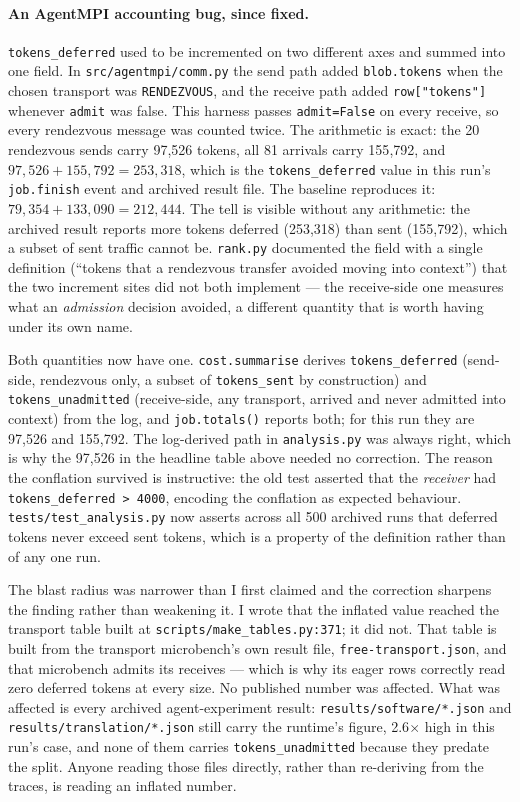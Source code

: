 \documentclass[11pt]{article}
\begin{document}
\paragraph{An AgentMPI accounting bug, since fixed.} \texttt{tokens\_deferred} used to be
incremented on two different axes and summed into one field. In \texttt{src/agentmpi/comm.py} the
send path added \texttt{blob.tokens} when the chosen transport was \texttt{RENDEZVOUS}, and the
receive path added \texttt{row["tokens"]} whenever \texttt{admit} was false. This harness passes
\texttt{admit=False} on every receive, so every rendezvous message was counted twice. The
arithmetic is exact: the 20 rendezvous sends carry 97{,}526 tokens, all 81 arrivals carry
155{,}792, and $97{,}526+155{,}792=253{,}318$, which is the \texttt{tokens\_deferred} value in
this run's \texttt{job.finish} event and archived result file. The baseline reproduces it:
$79{,}354+133{,}090=212{,}444$. The tell is visible without any arithmetic: the archived result
reports more tokens deferred (253{,}318) than sent (155{,}792), which a subset of sent traffic
cannot be. \texttt{rank.py} documented the field with a single definition (``tokens that a
rendezvous transfer avoided moving into context'') that the two increment sites did not both
implement --- the receive-side one measures what an \emph{admission} decision avoided, a different
quantity that is worth having under its own name.

Both quantities now have one. \texttt{cost.summarise} derives \texttt{tokens\_deferred}
(send-side, rendezvous only, a subset of \texttt{tokens\_sent} by construction) and
\texttt{tokens\_unadmitted} (receive-side, any transport, arrived and never admitted into context)
from the log, and \texttt{job.totals()} reports both; for this run they are 97{,}526 and
155{,}792. The log-derived path in \texttt{analysis.py} was always right, which is why the 97{,}526
in the headline table above needed no correction. The reason the conflation survived is instructive:
the old test asserted that the \emph{receiver} had \texttt{tokens\_deferred > 4000}, encoding the
conflation as expected behaviour. \texttt{tests/test\_analysis.py} now asserts across all 500
archived runs that deferred tokens never exceed sent tokens, which is a property of the definition
rather than of any one run.

The blast radius was narrower than I first claimed and the correction sharpens the finding rather
than weakening it. I wrote that the inflated value reached the transport table built at
\texttt{scripts/make\_tables.py:371}; it did not. That table is built from the transport
microbench's own result file, \texttt{free-transport.json}, and that microbench admits its
receives --- which is why its eager rows correctly read zero deferred tokens at every size. No
published number was affected. What was affected is every archived agent-experiment result:
\texttt{results/software/*.json} and \texttt{results/translation/*.json} still carry the runtime's
figure, 2.6$\times$ high in this run's case, and none of them carries
\texttt{tokens\_unadmitted} because they predate the split. Anyone reading those files directly,
rather than re-deriving from the traces, is reading an inflated number.
\end{document}
